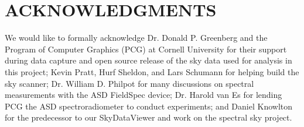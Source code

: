 \section*{ACKNOWLEDGMENTS}
\label{sec:acknowledgements}

We would like to formally acknowledge Dr. Donald P. Greenberg and the Program of Computer Graphics (PCG) at Cornell University for their support during data capture and open source release of the sky data used for analysis in this project; Kevin Pratt, Hurf Sheldon, and Lars Schumann for helping build the sky scanner; Dr. William D. Philpot for many discussions on spectral measurements with the ASD FieldSpec device; Dr. Harold van Es for lending PCG the ASD spectroradiometer to conduct experiments; and Daniel Knowlton for the predecessor to our SkyDataViewer and work on the spectral sky project.